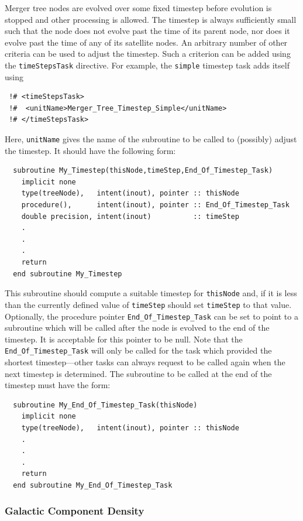 Merger tree nodes are evolved over some fixed timestep before evolution is stopped and other processing is allowed. The timestep is always sufficiently small such that the node does not evolve past the time of its parent node, nor does it evolve past the time of any of its satellite nodes. An arbitrary number of other criteria can be used to adjust the timestep. Such a criterion can be added using the {\tt timeStepsTask} directive. For example, the {\tt simple} timestep task adds itself using
\begin{verbatim}
 !# <timeStepsTask>
 !#  <unitName>Merger_Tree_Timestep_Simple</unitName>
 !# </timeStepsTask>
\end{verbatim}
Here, {\tt unitName} gives the name of the subroutine to be called to (possibly) adjust the timestep. It should have the following form:
\begin{verbatim}
  subroutine My_Timestep(thisNode,timeStep,End_Of_Timestep_Task)
    implicit none
    type(treeNode),   intent(inout), pointer :: thisNode
    procedure(),      intent(inout), pointer :: End_Of_Timestep_Task
    double precision, intent(inout)          :: timeStep
    .
    .
    .
    return
  end subroutine My_Timestep
\end{verbatim}
This subroutine should compute a suitable timestep for {\tt thisNode} and, if it is less than the currently defined value of {\tt timeStep} should set {\tt timeStep} to that value. Optionally, the procedure pointer {\tt End\_Of\_Timestep\_Task} can be set to point to a subroutine which will be called after the node is evolved to the end of the timestep. It is acceptable for this pointer to be null. Note that the {\tt End\_Of\_Timestep\_Task} will only be called for the task which provided the shortest timestep---other tasks can always request to be called again when the next timestep is determined. The subroutine to be called at the end of the timestep must have the form:
\begin{verbatim}
  subroutine My_End_Of_Timestep_Task(thisNode)
    implicit none
    type(treeNode),   intent(inout), pointer :: thisNode
    .
    .
    .
    return
  end subroutine My_End_Of_Timestep_Task
\end{verbatim}

\subsubsection{Galactic Component Density}

